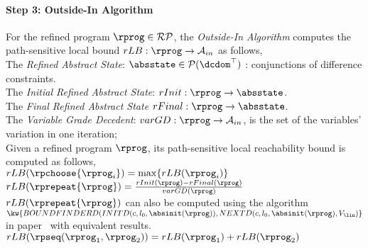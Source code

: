 \paragraph{Step 3: Outside-In Algorithm}
For the refined program $\rprog \in \mathcal{RP}$, the \emph{Outside-In Algorithm}
computes the path-sensitive local bound 
$rLB: \rprog \to \mathcal{A}_{in}$ as follows,
\\
The \emph{Refined Abstract State}: 
$\absstate \in \mathcal{P}(\dcdom^{\top})$ : conjunctions of difference constraints.
\\
The \emph{Initial Refined Abstract State}: $rInit : \rprog \to \absstate $.
\\
The \emph{Final Refined Abstract State} $rFinal : \rprog \to \absstate $.
\\
The \emph{Variable Grade Decedent}: $varGD : \rprog \to \mathcal{A}_{in}$, is the set of the variables' variation in one iteration;
\\
Given a refined program $\rprog$, its path-sensitive local reachability bound is computed as follows,
\\
$rLB(\rpchoose\{\rprog_i\}) =  \max\{rLB(\rprog_i)\}$
\\
$rLB(\rprepeat\{\rprog\}) =  \frac{rInit(\rprog) - rFinal(\rprog)}{varGD(\rprog)}$
\\
$rLB(\rprepeat\{\rprog\})$ can also be computed using the algorithm 
$\kw{BOUNDFINDERD(INITD(c, l_0, \absinit(\rprog)), NEXTD(c, l_0, \absinit(\rprog), V_{\lin} )}$ 
in paper~\cite{GulwaniJK09} with equivalent results.
\\
$rLB(\rpseq(\rprog_1, \rprog_2)) =  rLB(\rprog_1)+ rLB( \rprog_2)$
\\
